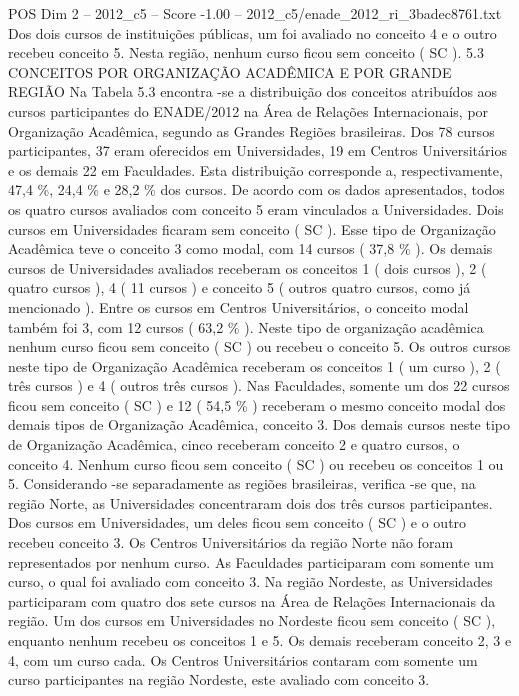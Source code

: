 \begin{textsample}{POS Dim 2 – 2012\_c5 – Score -1.00 – 2012\_c5/enade\_2012\_ri\_3badec8761.txt}
Dos dois cursos de instituições públicas, um foi avaliado no conceito 4 e o outro recebeu conceito 5.
Nesta região, nenhum curso ficou sem conceito ( SC ). 5.3 CONCEITOS POR ORGANIZAÇÃO ACADÊMICA E POR GRANDE REGIÃO Na Tabela 5.3 encontra -se a distribuição dos conceitos atribuídos aos cursos participantes do ENADE/2012 na Área de Relações Internacionais, por Organização Acadêmica, segundo as Grandes Regiões brasileiras.
Dos 78 cursos participantes, 37 eram oferecidos em Universidades, 19 em Centros Universitários e os demais 22 em Faculdades.
Esta distribuição corresponde a, respectivamente, 47,4 \%, 24,4 \% e 28,2 \% dos cursos.
De acordo com os dados apresentados, todos os quatro cursos avaliados com conceito 5 eram vinculados a Universidades.
Dois cursos em Universidades ficaram sem conceito ( SC ).
Esse tipo de Organização Acadêmica teve o conceito 3 como modal, com 14 cursos ( 37,8 \% ).
Os demais cursos de Universidades avaliados receberam os conceitos 1 ( dois cursos ), 2 ( quatro cursos ), 4 ( 11 cursos ) e conceito 5 ( outros quatro cursos, como já mencionado ).
Entre os cursos em Centros Universitários, o conceito modal também foi 3, com 12 cursos ( 63,2 \% ).
Neste tipo de organização acadêmica nenhum curso ficou sem conceito ( SC ) ou recebeu o conceito 5.
Os outros cursos neste tipo de Organização Acadêmica receberam os conceitos 1 ( um curso ), 2 ( três cursos ) e 4 ( outros três cursos ).
Nas Faculdades, somente um dos 22 cursos ficou sem conceito ( SC ) e 12 ( 54,5 \% ) receberam o mesmo conceito modal dos demais tipos de Organização Acadêmica, conceito 3.
Dos demais cursos neste tipo de Organização Acadêmica, cinco receberam conceito 2 e quatro cursos, o conceito 4.
Nenhum curso ficou sem conceito ( SC ) ou recebeu os conceitos 1 ou 5.
Considerando -se separadamente as regiões brasileiras, verifica -se que, na região Norte, as Universidades concentraram dois dos três cursos participantes.
Dos cursos em Universidades, um deles ficou sem conceito ( SC ) e o outro recebeu conceito 3.
Os Centros Universitários da região Norte não foram representados por nenhum curso.
As Faculdades participaram com somente um curso, o qual foi avaliado com conceito 3.
Na região Nordeste, as Universidades participaram com quatro dos sete cursos na Área de Relações Internacionais da região.
Um dos cursos em Universidades no Nordeste ficou sem conceito ( SC ), enquanto nenhum recebeu os conceitos 1 e 5.
Os demais receberam conceito 2, 3 e 4, com um curso cada.
Os Centros Universitários contaram com somente um curso participantes na região Nordeste, este avaliado com conceito 3.

\end{textsample}
